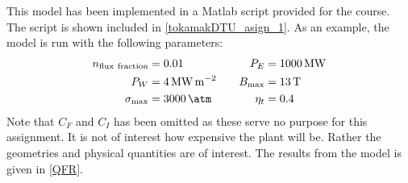 \newline This model has been implemented in a Matlab script provided for the course. The script is shown included in \cref{tokamakDTU_asign_1}.
As an example, the model is run with the following parameters:
\begin{alignat}{3}
	n_\mathrm{flux \ fraction} & = 0.01                                 & \quad P_E      & = \SI{1000}{\mega\watt} \nonumber       \\
	P_W                        & = \SI{4}{\mega\watt\per\meter\squared} & \quad B_{\max} & = \SI{13}{\tesla}    \label{Inputparam} \\
	\sigma_{\max}              & = \SI{3000}{\atm}                      & \quad \eta_t   & = 0.4 \nonumber
\end{alignat}
Note that \(C_F\) and \(C_I\) has been omitted as these serve no purpose for this assignment. It is not of interest how expensive the plant will be. Rather the geometries and physical quantities are of interest.
The results from the model is given in \cref{QFR}.
